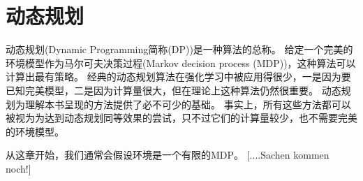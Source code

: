 \chapter{动态规划}

动态规划(Dynamic Programming简称(DP))是一种算法的总称。
给定一个完美的环境模型作为马尔可夫决策过程(Markov decision process (MDP))，这种算法可以计算出最有策略。
经典的动态规划算法在强化学习中被应用得很少，一是因为要已知完美模型，二是因为计算量很大，但在理论上这种算法仍然很重要。
动态规划为理解本书呈现的方法提供了必不可少的基础。
事实上，所有这些方法都可以被视为为达到动态规划同等效果的尝试，只不过它们的计算量较少，也不需要完美的环境模型。

从这章开始，我们通常会假设环境是一个有限的MDP。
[....Sachen kommen noch!]
